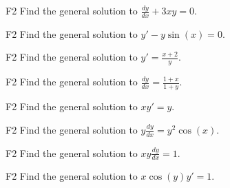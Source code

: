 \begin{problem}{F2}
Find the general solution to \(\frac{dy}{dx} + 3xy = 0\).
\end{problem}

\begin{problem}{F2}
Find the general solution to \(y' - y\sin(x)=0\).
\end{problem} 

\begin{problem}{F2}
Find the general solution to \(y' = \frac{x+2}{y}\).
\end{problem}

\begin{problem}{F2}
Find the general solution to \(\frac{dy}{dx} = \frac{1 + x}{1 + y}\).
\end{problem}

\begin{problem}{F2}
Find the general solution to \(xy' = y\).
\end{problem}

\begin{problem}{F2}
Find the general solution to \(y\frac{dy}{dx} = y^2\cos(x)\).
\end{problem}

\begin{problem}{F2}
Find the general solution to \(xy\frac{dy}{dx} = 1\).
\end{problem}

\begin{problem}{F2}
Find the general solution to \(x\cos(y)y' = 1\).
\end{problem}

